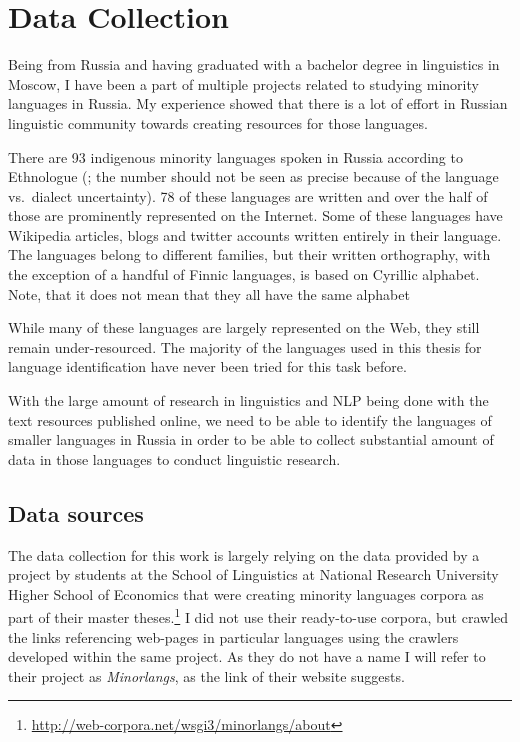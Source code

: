 \chapter{Data Collection}

Being from Russia and having graduated with a bachelor degree in linguistics in Moscow, I have been a part of multiple projects related to studying minority languages in Russia. My experience showed that there is a lot of effort in Russian linguistic community towards creating resources for those languages. 

There are 93 indigenous minority languages spoken in Russia according to Ethnologue (\parencite{lewis2009ethnologue}; the number should not be seen as precise because of the language vs.\ dialect uncertainty). 78 of these languages are written and over the half of those are prominently represented on the Internet. Some of these languages have Wikipedia articles, blogs and twitter accounts written entirely in their language. The languages belong to different families, but their written orthography, with the exception of a handful of Finnic languages, is based on Cyrillic alphabet. Note, that it does not mean that they all have the same alphabet

While many of these languages are largely represented on the Web, they still remain under-resourced. The majority of the languages used in this thesis for language identification have never been tried for this task before.

With the large amount of research in linguistics and NLP being done with the text resources published online, we need to be able to identify the languages of smaller languages in Russia in order to be able to collect substantial amount of data in those languages to conduct linguistic research.


\section{Data sources}

The data collection for this work is largely relying on the data provided by a project by students at the School of Linguistics at National Research University Higher School of Economics that were creating minority languages corpora as part of their master theses.\footnote{\url{http://web-corpora.net/wsgi3/minorlangs/about}} I did not use their ready-to-use corpora, but crawled the links referencing web-pages in particular languages using the crawlers developed within the same project. As they do not have a name I will refer to their project as \textit{Minorlangs}, as the link of their website suggests. 

